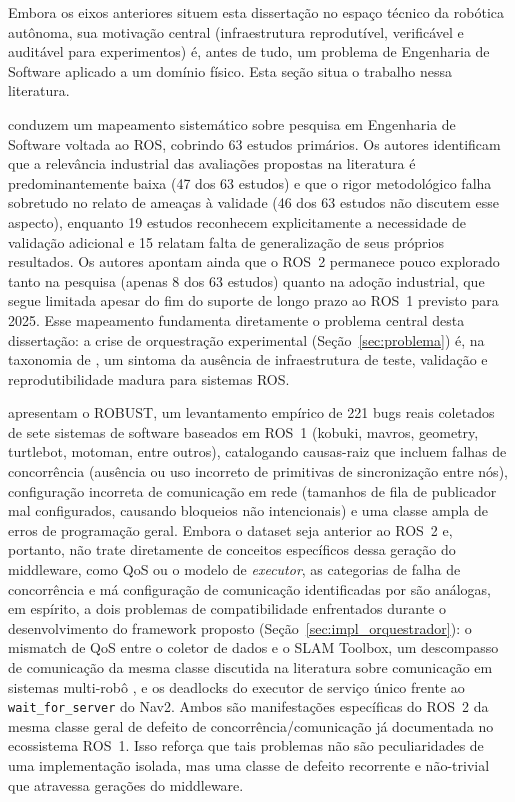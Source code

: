 Embora os eixos anteriores situem esta dissertação no espaço técnico da robótica
autônoma, sua motivação central (infraestrutura reprodutível, verificável e
auditável para experimentos) é, antes de tudo, um problema de Engenharia de
Software aplicado a um domínio físico. Esta seção situa o trabalho nessa literatura.

 conduzem um mapeamento sistemático sobre pesquisa em
Engenharia de Software voltada ao ROS, cobrindo 63 estudos primários. Os autores
identificam que a relevância industrial das avaliações propostas na literatura é
predominantemente baixa (47 dos 63 estudos) e que o rigor metodológico falha
sobretudo no relato de ameaças à validade (46 dos 63 estudos não discutem esse
aspecto), enquanto 19 estudos reconhecem explicitamente a necessidade de validação
adicional e 15 relatam falta de generalização de seus próprios resultados. Os
autores apontam ainda que o ROS~2 permanece pouco explorado tanto na pesquisa
(apenas 8 dos 63 estudos) quanto na adoção industrial, que segue limitada apesar
do fim do suporte de longo prazo ao ROS~1 previsto para 2025. Esse mapeamento
fundamenta diretamente o problema central desta dissertação: a crise de
orquestração experimental (Seção~\ref{sec:problema}) é, na taxonomia de
\citeauthor{albonico2023}, um sintoma da ausência de infraestrutura de teste,
validação e reprodutibilidade madura para sistemas ROS.

 apresentam o ROBUST, um levantamento empírico de 221 bugs
reais coletados de sete sistemas de software baseados em ROS~1 (kobuki, mavros,
geometry, turtlebot, motoman, entre outros), catalogando causas-raiz que incluem
falhas de concorrência (ausência ou uso incorreto de primitivas de sincronização
entre nós), configuração incorreta de comunicação em rede (tamanhos de fila de
publicador mal configurados, causando bloqueios não intencionais) e uma classe
ampla de erros de programação geral. Embora o dataset seja anterior ao ROS~2 e,
portanto, não trate diretamente de conceitos específicos dessa geração do
middleware, como QoS ou o modelo de \textit{executor}, as categorias de
falha de concorrência e má configuração de comunicação identificadas por
\citeauthor{timperley2024} são análogas, em espírito, a dois problemas de
compatibilidade enfrentados durante o desenvolvimento do framework proposto
(Seção~\ref{sec:impl_orquestrador}): o mismatch de QoS entre o coletor de
dados e o SLAM Toolbox, um descompasso de comunicação da mesma classe
discutida na literatura sobre comunicação em sistemas multi-robô
\cite{gielis2022}, e os deadlocks do executor de serviço único frente ao
\texttt{wait\_\allowbreak for\_\allowbreak server} do Nav2. Ambos são manifestações específicas do
ROS~2 da mesma classe geral de defeito de concorrência/comunicação já
documentada no ecossistema ROS~1. Isso reforça que tais problemas não são peculiaridades de
uma implementação isolada, mas uma classe de defeito recorrente e não-trivial
que atravessa gerações do middleware.

